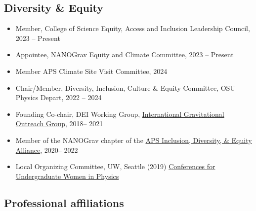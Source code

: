 \documentclass[11pt,letterpaper,sans,unicode]{moderncv}
\begin{document}
\subsection{Diversity \& Equity}
\begin{itemize}[leftmargin=8mm]
\item Member, College of Science Equity, Access and Inclusion Leadership Council, 2023 -- Present
\item Appointee, NANOGrav Equity and Climate Committee, 2023 -- Present
\item Member APS Climate Site Visit Committee, 2024
\item Chair/Member, Diversity, Inclusion, Culture \& Equity Committee, OSU Physics Depart, 2022 -- 2024

\item Founding Co-chair, DEI Working Group,  {\color{color1} \href{https://indico.ego-gw.it/event/29/sessions/53/attachments/420/685/International_Gravitational-Wave_Outreach_Group_Meeting__Briefing_Document.pdf}{International Gravitational Outreach Group}}, 2018-- 2021
\item Member of the NANOGrav chapter of the {\color{color1} \href{https://www.aps.org/programs/innovation/fund/idea.cfm}{APS Inclusion, Diversity, \& Equity Alliance}}, 2020-- 2022
\item Local Organizing Committee, UW, Seattle (2019) {\color{color1} \href{https://www.aps.org/programs/women/cuwip/cuwiphistory.cfm}{Conferences for Undergraduate Women in Physics}}
\end{itemize}

\subsection{Professional affiliations}
%
 \vspace{-0.1cm}

 \vspace{-0.1cm}
 \vspace{-0.1cm}
 \vspace{-0.1cm}
 \vspace{-0.1cm}
\end{document}
